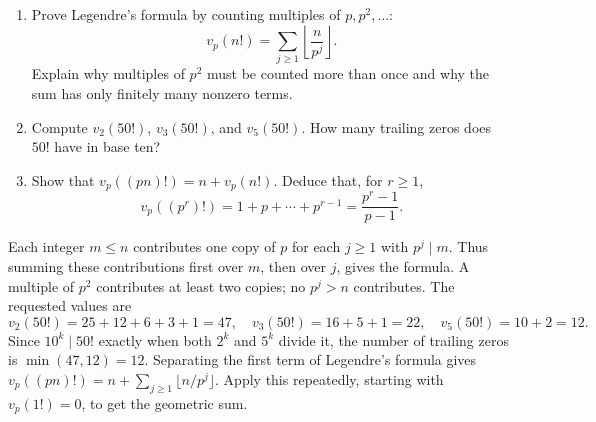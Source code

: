 \begin{enumerate}
 \item Prove Legendre's formula by counting multiples of $p,p^2,\ldots$:
 \[
 v_p(n!)=\sum_{j\ge1}\left\lfloor\frac{n}{p^j}\right\rfloor.
 \]
 Explain why multiples of $p^2$ must be counted more than once and why
 the sum has only finitely many nonzero terms. 
 \item Compute $v_2(50!)$, $v_3(50!)$, and $v_5(50!)$.
 How many trailing zeros does $50!$ have in base ten? 
 \item Show that $v_p((pn)!)=n+v_p(n!)$. Deduce that, for $r\ge1$,
 \[
 v_p((p^r)!)=1+p+\cdots+p^{r-1}=\frac{p^r-1}{p-1}.
 \]
\end{enumerate}
\begin{solution}
Each integer $m\le n$ contributes one copy of $p$ for each $j\ge1$ with
$p^j\mid m$. Thus summing these contributions first over $m$, then over
$j$, gives the formula. A multiple of $p^2$ contributes at least two copies;
no $p^j>n$ contributes.
The requested values are
\[
 v_2(50!)=25+12+6+3+1=47,\quad
 v_3(50!)=16+5+1=22,\quad v_5(50!)=10+2=12.
\]
Since $10^k\mid50!$ exactly when both $2^k$ and $5^k$ divide it, the
number of trailing zeros is $\min(47,12)=12$.
Separating the first term of Legendre's formula gives
$v_p((pn)!)=n+\sum_{j\ge1}\lfloor n/p^j\rfloor$.
Apply this repeatedly, starting with $v_p(1!)=0$, to get the geometric sum.
\end{solution}


